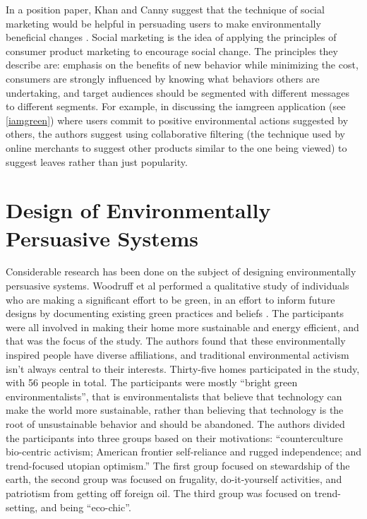 In a position paper, Khan and Canny suggest that the technique of social marketing would be helpful in persuading users to make environmentally beneficial changes \cite{Khan2008-social-marketing}. Social marketing is the idea of applying the principles of consumer product marketing to encourage social change. The principles they describe are: emphasis on the benefits of new behavior while minimizing the cost, consumers are strongly influenced by knowing what behaviors others are undertaking, and target audiences should be segmented with different messages to different segments. For example, in discussing the iamgreen application (see \autoref{iamgreen}) where users commit to positive environmental actions suggested by others, the authors suggest using collaborative filtering (the technique used by online merchants to suggest other products similar to the one being viewed) to suggest leaves rather than just popularity.

\section{Design of Environmentally Persuasive Systems}

Considerable research has been done on the subject of designing environmentally persuasive systems. Woodruff et al performed a qualitative study of individuals who are making a significant effort to be green, in an effort to inform future designs by documenting existing green practices and beliefs \cite{Woodruff2008-bright-green}. The participants were all involved in making their home more sustainable and energy efficient, and that was the focus of the study. The authors found that these environmentally inspired people have diverse affiliations, and traditional environmental activism isn't always central to their interests. Thirty-five homes participated in the study, with 56 people in total. The participants were mostly ``bright green environmentalists'', that is environmentalists that believe that technology can make the world more sustainable, rather than believing that technology is the root of unsustainable behavior and should be abandoned. The authors divided the participants into three groups based on their motivations: ``counterculture bio-centric activism; American frontier self-reliance and rugged independence; and trend-focused utopian optimism.'' The first group focused on stewardship of the earth, the second group was focused on frugality, do-it-yourself activities, and patriotism from getting off foreign oil. The third group was focused on trend-setting, and being ``eco-chic''.

